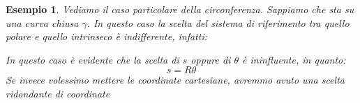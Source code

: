 \documentclass[11pt,a4paper,twoside]{article}
\newtheorem{es}{Esempio}
\theoremstyle{definition}
\begin{document}
\begin{es}
	Vediamo il caso particolare della circonferenza. Sappiamo che sta su una curva chiusa $\gamma$. In questo caso la scelta del sistema di riferimento tra quello polare e quello intrinseco è indifferente, infatti:
	\begin{center}
	\end{center}
	In questo caso è evidente che la scelta di $s$ oppure di $\theta$ è ininfluente, in quanto:
	\[ s = R \theta \]
	Se invece volessimo mettere le coordinate cartesiane, avremmo avuto una scelta ridondante di coordinate
\end{es}
\end{document}
